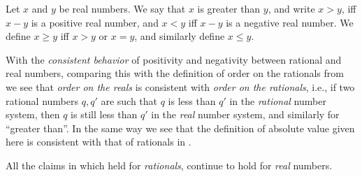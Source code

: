 \begin{definition}  \label{def 5.4.6}
Let \(x\) and \(y\) be real numbers.
We say that \(x\) is greater than \(y\), and write \(x > y\), iff \(x - y\) is a positive real number, and \(x < y\) iff \(x - y\) is a negative real number.
We define \(x \ge y\) iff \(x > y\) or \(x = y\), and similarly define \(x \le y\).
\end{definition}

\begin{note}
With the \emph{consistent behavior} of positivity and negativity between rational and real numbers,
comparing this with the definition of order on the rationals from 
we see that \emph{order on the reals} is consistent with \emph{order on the rationals},
i.e., if two rational numbers \(q, q'\) are such that \(q\) is less than \(q'\) in the \emph{rational} number system,
then \(q\) is still less than \(q'\) in the \emph{real} number system,
and similarly for ``greater than''.
In the same way we see that the definition of absolute value given here is consistent with that of rationals in .
\end{note}

\begin{proposition} \label{prop 5.4.7}
All the claims in  which held for \emph{rationals}, continue to hold for \emph{real} numbers.
\end{proposition}

